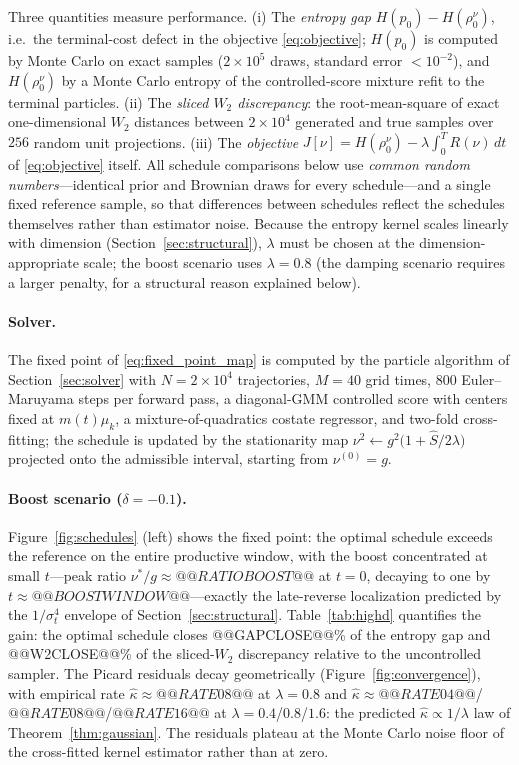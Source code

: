     Three quantities measure performance. (i) The \emph{entropy gap} $H(p_0)-H(\rho_0^\nu)$, i.e.\ the terminal-cost defect in the objective \eqref{eq:objective}; $H(p_0)$ is computed by Monte Carlo on exact samples ($2\times10^5$ draws, standard error $<10^{-2}$), and $H(\rho_0^\nu)$ by a Monte Carlo entropy of the controlled-score mixture refit to the terminal particles. (ii) The \emph{sliced $W_2$ discrepancy}: the root-mean-square of exact one-dimensional $W_2$ distances between $2\times10^4$ generated and true samples over $256$ random unit projections. (iii) The \emph{objective} $J[\nu]=H(\rho_0^\nu)-\lambda\int_0^T R(\nu)\,dt$ of \eqref{eq:objective} itself. All schedule comparisons below use \emph{common random numbers}---identical prior and Brownian draws for every schedule---and a single fixed reference sample, so that differences between schedules reflect the schedules themselves rather than estimator noise. Because the entropy kernel scales linearly with dimension (Section~\ref{sec:structural}), $\lambda$ must be chosen at the dimension-appropriate scale; the boost scenario uses $\lambda=0.8$ (the damping scenario requires a larger penalty, for a structural reason explained below).

    \paragraph{Solver.} The fixed point of \eqref{eq:fixed_point_map} is computed by the particle algorithm of Section~\ref{sec:solver} with $N=2\times10^{4}$ trajectories, $M=40$ grid times, $800$ Euler--Maruyama steps per forward pass, a diagonal-GMM controlled score with centers fixed at $m(t)\mu_k$, a mixture-of-quadratics costate regressor, and two-fold cross-fitting; the schedule is updated by the stationarity map $\nu^2\leftarrow g^2\bigl(1+\hat S/2\lambda\bigr)$ projected onto the admissible interval, starting from $\nu^{(0)}=g$.

    \paragraph{Boost scenario ($\delta=-0.1$).} Figure~\ref{fig:schedules} (left) shows the fixed point: the optimal schedule exceeds the reference on the entire productive window, with the boost concentrated at small $t$---peak ratio $\nu^*/g\approx@@RATIOBOOST@@$ at $t=0$, decaying to one by $t\approx@@BOOSTWINDOW@@$---exactly the late-reverse localization predicted by the $1/\sigma_t^4$ envelope of Section~\ref{sec:structural}. Table~\ref{tab:highd} quantifies the gain: the optimal schedule closes @@GAPCLOSE@@\% of the entropy gap and @@W2CLOSE@@\% of the sliced-$W_2$ discrepancy relative to the uncontrolled sampler. The Picard residuals decay geometrically (Figure~\ref{fig:convergence}), with empirical rate $\hat\kappa\approx@@RATE08@@$ at $\lambda=0.8$ and $\hat\kappa\approx@@RATE04@@$/$@@RATE08@@$/$@@RATE16@@$ at $\lambda=0.4$/$0.8$/$1.6$: the predicted $\hat\kappa\propto1/\lambda$ law of Theorem~\ref{thm:gaussian}. The residuals plateau at the Monte Carlo noise floor of the cross-fitted kernel estimator rather than at zero.

